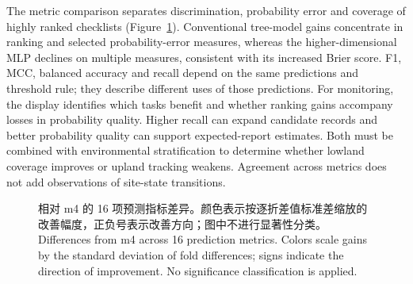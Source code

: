 \else
The metric comparison separates discrimination, probability error and coverage of highly ranked checklists (Figure~\ref{fig:heat}). Conventional tree-model gains concentrate in ranking and selected probability-error measures, whereas the higher-dimensional MLP declines on multiple measures, consistent with its increased Brier score. F1, MCC, balanced accuracy and recall depend on the same predictions and threshold rule; they describe different uses of those predictions. For monitoring, the display identifies which tasks benefit and whether ranking gains accompany losses in probability quality. Higher recall can expand candidate records and better probability quality can support expected-report estimates. Both must be combined with environmental stratification to determine whether lowland coverage improves or upland tracking weakens. Agreement across metrics does not add observations of site-state transitions.
\fi
\begin{figure}[htbp]\centering{}
\caption{\ifzh
相对 m4 的 16 项预测指标差异。颜色表示按逐折差值标准差缩放的改善幅度，正负号表示改善方向；图中不进行显著性分类。
\else
Differences from m4 across 16 prediction metrics. Colors scale gains by the standard deviation of fold differences; signs indicate the direction of improvement. No significance classification is applied.
\fi}\label{fig:heat}
\end{figure}
\FloatBarrier
